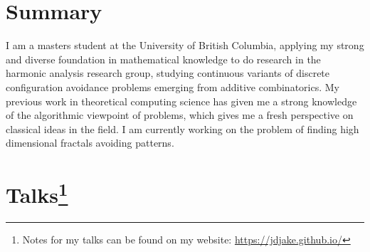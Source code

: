\documentclass{friggeri-cv}
\begin{document}
\section{Summary}

I am a masters student at the University of British Columbia, applying my strong and diverse foundation in mathematical knowledge to do research in the harmonic analysis research group, studying continuous variants of discrete configuration avoidance problems emerging from additive combinatorics. My previous work in theoretical computing science has given me a strong knowledge of the algorithmic viewpoint of problems, which gives me a fresh perspective on classical ideas in the field. I am currently working on the problem of finding high dimensional fractals avoiding patterns.


\pagebreak[3]
\section{Talks\footnote{Notes for my talks can be found on my website: \href{https://jdjake.github.io/}{https://jdjake.github.io/}}} %
\end{document}
